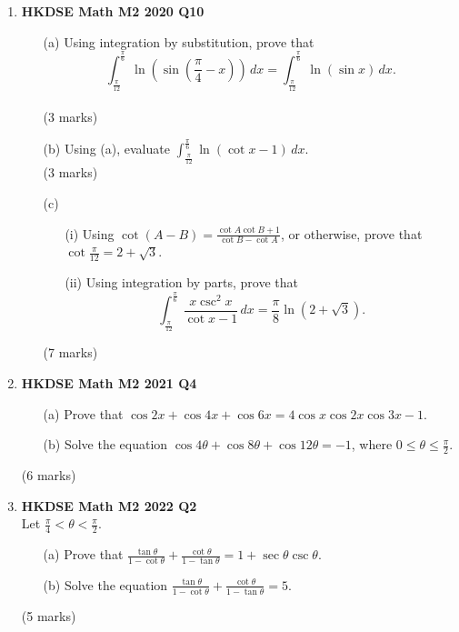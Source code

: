 \documentclass{report}
\begin{document}
\begin{enumerate}
	\item \textbf{HKDSE Math M2 2020 Q10}
	\begin{enumerate}
		\item [(a)]Using integration by substitution, prove that $$\displaystyle \int_{\tfrac{\pi}{12}}^{\tfrac{\pi}{6}}  \ln{\left(\sin{\left(\frac{\pi}{4} - x\right)}\right)}\,dx = \int_{\tfrac{\pi}{12}}^{\tfrac{\pi}{6}}  \ln{(\sin{x})}\,dx.$$ \\(3 marks)
		\item [(b)] Using (a), evaluate $\displaystyle \int_{\tfrac{\pi}{12}}^{\tfrac{\pi}{6}}  \ln{(\cot{x} - 1)}\,dx$. \\(3 marks)
		\item [(c)] 
		\begin{enumerate}
			\item [(i)] Using $\cot{(A-B)} = \displaystyle \frac{\cot{A}\cot{B}+1}{\cot{B} - \cot{A}}$, or otherwise, prove that $\displaystyle \cot{\frac{\pi}{12}} = 2 + \sqrt{3}$. 
			\item [(ii)] Using integration by parts, prove that $$\displaystyle\int_{\tfrac{\pi}{12}}^{\tfrac{\pi}{6}}  \frac{x\csc^2{x}}{\cot{x} -1}\,dx = \frac{\pi}{8} \ln{(2 + \sqrt{3})}.$$
		\end{enumerate}
	    (7 marks)
	\end{enumerate}

	\item \textbf{HKDSE Math M2 2021 Q4}
	\begin{enumerate}
		\item [(a)] Prove that $\cos{2x} + \cos {4x} + \cos {6x} = 4\cos{x}\cos{2x}\cos{3x} -1$.
		\item [(b)] Solve the equation $\cos{4\theta} + \cos{8\theta} + \cos{12\theta} = -1$, where $\displaystyle0 \leq \theta \leq \frac{\pi}{2}$.
	\end{enumerate}
	(6 marks)

	\item \textbf{HKDSE Math M2 2022 Q2}\\
	Let $\displaystyle \frac{\pi}{4} < \theta < \frac{\pi}{2}$.
	\begin{enumerate}
		\item [(a)] Prove that $\displaystyle \frac{\tan{\theta}}{1-\cot{\theta}} + \frac{\cot{\theta}}{1-\tan{\theta}} = 1+\sec{\theta}\csc{\theta}$.
		\item [(b)] Solve the equation $\displaystyle \frac{\tan{\theta}}{1-\cot{\theta}} + \frac{\cot{\theta}}{1-\tan{\theta}} = 5$.
	\end{enumerate}
	(5 marks)


\end{enumerate}
\end{document}
